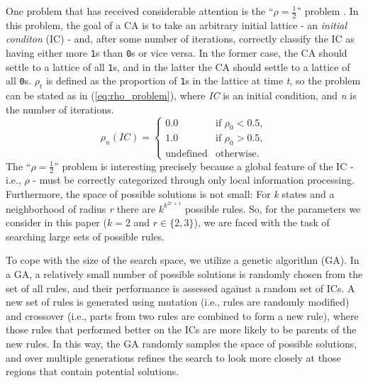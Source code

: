 One problem that has received considerable attention is the ``$\rho = \frac{1}{2}$'' problem \cite{Mitchell:1994:ECA:186092.186116}. In this problem, 
the goal of a CA is to take an arbitrary initial lattice - an \textit{initial conditon} (IC) - and, after some number of iterations, correctly classify the 
IC as having either more \texttt{1}s than \texttt{0}s or vice versa. In the former case, the CA should settle to a lattice of all 
\texttt{1}s, and in the latter the CA should settle to a lattice of all \texttt{0}s. $\rho_t$ is defined as the proportion of 
\texttt{1}s in the lattice at time \textit{t}, so the problem can be stated as in (\ref{eq:rho_problem}), where \textit{IC} is an initial condition, and \textit{n} is the number of iterations.
\begin{equation} \label{eq:rho_problem}
  \rho_n(IC) =
  \begin{cases}
    0.0 & \text{if } \rho_0 < 0.5,
    \\
    1.0 & \text{if } \rho_0 > 0.5,
   \\
    \text{undefined} & \text{otherwise}.
  \end{cases}
\end{equation}
The ``$\rho = \frac{1}{2}$'' problem is interesting precisely because a global feature of the IC - i.e., $\rho$ - must be correctly categorized through only 
local information processing. Furthermore, the space of possible solutions is not small: For \textit{k} states and a neighborhood of radius \textit{r} there are $k^{k^{2r+1}}$ possible rules. So, for the parameters we consider in this paper ($k = 2$ and $r \in \lbrace2, 3\rbrace$), we are faced with the task of searching large sets of possible rules. 

To cope with the size of the search space, we utilize a genetic algorithm (GA). In a GA, a relatively small number of possible solutions is randomly chosen from 
the set of all rules, and their performance is assessed against a random set of ICs. A new set of rules is generated using mutation (i.e., rules are randomly modified) and crossover (i.e., parts from two rules are combined to form a new rule), where those rules that performed better on the ICs are more likely to be parents of the new rules. In this way, the GA randomly samples the space of possible solutions, and over multiple generations refines the search to look more closely at those regions that contain potential solutions.


